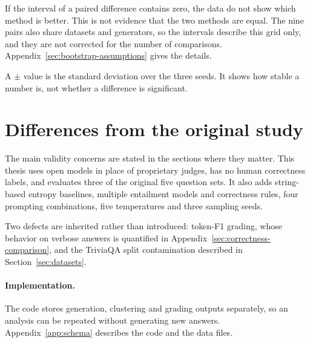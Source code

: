 If the interval of a paired difference contains zero, the data do not show
which method is better. This is not evidence that the two methods are equal.
The nine pairs also share datasets and generators, so the intervals describe
this grid only, and they are not corrected for the number of comparisons.
Appendix~\ref{sec:bootstrap-assumptions} gives the details.

A $\pm$ value is the standard deviation over the three seeds. It shows how
stable a number is, not whether a difference is significant.

\section{Differences from the original study}
\label{sec:deviation-register}

The main validity concerns are stated in the sections where they matter. This
thesis uses open models in place of proprietary judges, has no human correctness
labels, and evaluates three of the original five question sets. It also adds
string-based entropy baselines, multiple entailment models and correctness
rules, four prompting combinations, five temperatures and three sampling
seeds.

Two defects are inherited rather than introduced: token-F1 grading, whose
behavior on verbose answers is quantified in
Appendix~\ref{sec:correctness-comparison}, and the TriviaQA split contamination
described in Section~\ref{sec:datasets}.

\paragraph{Implementation.}
\label{sec:hpc-execution}
The code stores generation, clustering and grading outputs separately, so an
analysis can be repeated without generating new answers.
Appendix~\ref{app:schema} describes the code and the data files.
